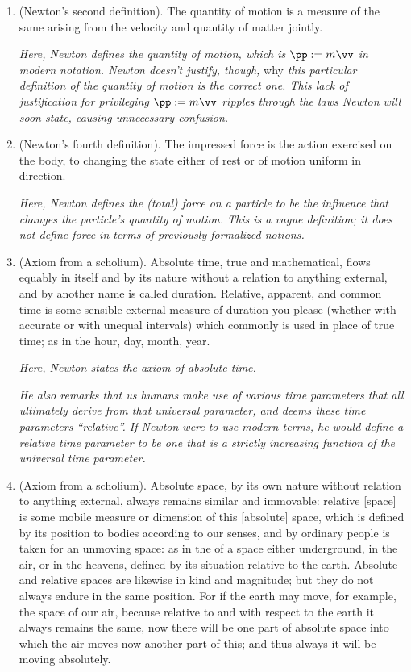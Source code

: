 \documentclass{article}
\begin{document}
\begin{enumerate}	
	\item (Newton's second definition). The quantity of motion is a measure of the same arising from the velocity and quantity of
	matter jointly.
	
	\textit{Here, Newton defines the quantity of motion, which is $\pp := m\vv$ in modern notation. Newton doesn't justify, though,} why \textit{this particular definition of the quantity of motion is the correct one. This lack of justification for privileging $\pp := m\vv$ ripples through the laws Newton will soon state, causing unnecessary confusion.}

	\item (Newton's fourth definition). The impressed force is the action exercised on the body, to changing the state either of rest or of motion uniform in direction.
	
	\textit{Here, Newton defines the (total) force on a particle to be the influence that changes the particle's quantity of motion. This is a vague definition; it does not define force in terms of previously formalized notions.}
	
	\item (Axiom from a scholium). Absolute time, true and mathematical, flows equably in itself and by its nature without a relation to anything external, and by another name is called duration. Relative, apparent, and common time is some sensible external measure of duration you please (whether with accurate or with unequal intervals) which commonly is used in place of true time; as in the hour, day, month, year.
	
	\textit{Here, Newton states the axiom of absolute time.}
	
	\textit{He also remarks that us humans make use of various time parameters that all ultimately derive from that universal parameter, and deems these time parameters ``relative''. If Newton were to use modern terms, he would define a relative time parameter to be one that is a strictly increasing function of the universal time parameter.}
	
	\item (Axiom from a scholium). Absolute space, by its own nature without relation to anything external, always remains similar and immovable: relative [space] is some mobile measure or dimension of this [absolute] space, which is defined by its position to bodies according to our senses, and by ordinary people is taken for an unmoving space: as in the of a space either underground, in the air, or in the heavens, defined by its situation relative to the earth. Absolute and relative spaces are likewise in kind and magnitude; but they do not always endure in the same position. For if the earth may move, for example, the space of our air, because relative to and with respect to the earth it always remains the same, now there will be one part of absolute space into which the air moves now another part of this; and thus always it will be moving absolutely. 
	

\end{enumerate}
\end{document}
